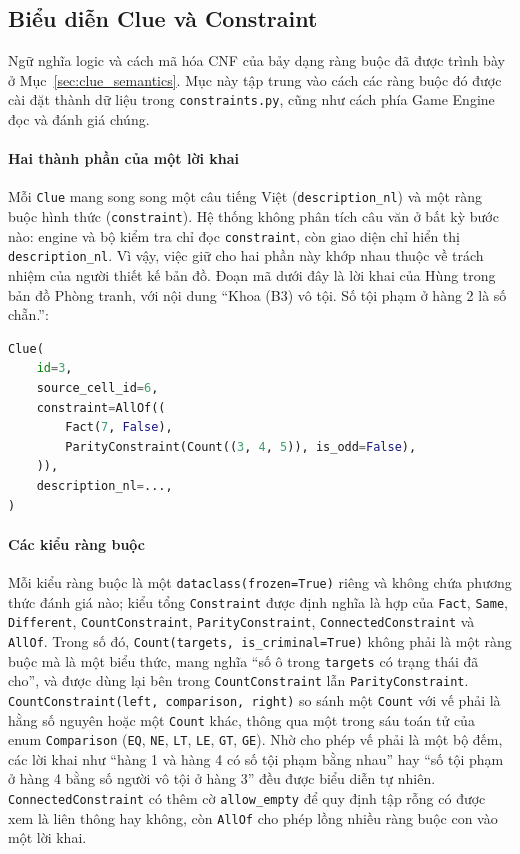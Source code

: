 \subsection{Biểu diễn Clue và Constraint}
\label{sec:clue_representation}
\begin{sloppypar}

Ngữ nghĩa logic và cách mã hóa CNF của bảy dạng ràng buộc đã được trình bày ở
Mục~\ref{sec:clue_semantics}. Mục này tập trung vào cách các ràng buộc đó được
cài đặt thành dữ liệu trong \texttt{constraints.py}, cũng như cách phía Game
Engine đọc và đánh giá chúng.

\paragraph{Hai thành phần của một lời khai}
Mỗi \texttt{Clue} mang song song một câu tiếng Việt (\texttt{description\_nl})
và một ràng buộc hình thức (\texttt{constraint}). Hệ thống không phân tích câu
văn ở bất kỳ bước nào: engine và bộ kiểm tra chỉ đọc \texttt{constraint}, còn
giao diện chỉ hiển thị \texttt{description\_nl}. Vì vậy, việc giữ cho hai phần
này khớp nhau thuộc về trách nhiệm của người thiết kế bản đồ. Đoạn mã dưới đây là
lời khai của Hùng trong bản đồ Phòng tranh, với nội dung ``Khoa (B3) vô tội. Số
tội phạm ở hàng 2 là số chẵn.'':
\begin{lstlisting}[language=Python, numbers=none]
Clue(
    id=3,
    source_cell_id=6,
    constraint=AllOf((
        Fact(7, False),
        ParityConstraint(Count((3, 4, 5)), is_odd=False),
    )),
    description_nl=...,
)
\end{lstlisting}

\paragraph{Các kiểu ràng buộc}
Mỗi kiểu ràng buộc là một \texttt{dataclass(frozen=True)} riêng và không chứa
phương thức đánh giá nào; kiểu tổng \texttt{Constraint} được định nghĩa là hợp
của \texttt{Fact}, \texttt{Same}, \texttt{Different}, \texttt{CountConstraint},
\texttt{ParityConstraint}, \texttt{ConnectedConstraint} và \texttt{AllOf}. Trong
số đó, \texttt{Count(targets, is\_criminal=True)} không phải là một ràng buộc mà
là một biểu thức, mang nghĩa ``số ô trong \texttt{targets} có trạng thái đã
cho'', và được dùng lại bên trong \texttt{CountConstraint} lẫn
\texttt{ParityConstraint}. \texttt{CountConstraint(left, comparison, right)}
so sánh một \texttt{Count} với vế phải là hằng số nguyên hoặc một \texttt{Count}
khác, thông qua một trong sáu toán tử của enum \texttt{Comparison} (\texttt{EQ},
\texttt{NE}, \texttt{LT}, \texttt{LE}, \texttt{GT}, \texttt{GE}). Nhờ cho phép vế
phải là một bộ đếm, các lời khai như ``hàng 1 và hàng 4 có số tội phạm bằng
nhau'' hay ``số tội phạm ở hàng 4 bằng số người vô tội ở hàng 3'' đều được biểu
diễn tự nhiên. \texttt{ConnectedConstraint} có thêm cờ \texttt{allow\_empty} để
quy định tập rỗng có được xem là liên thông hay không, còn \texttt{AllOf} cho
phép lồng nhiều ràng buộc con vào một lời khai.


\end{sloppypar}

